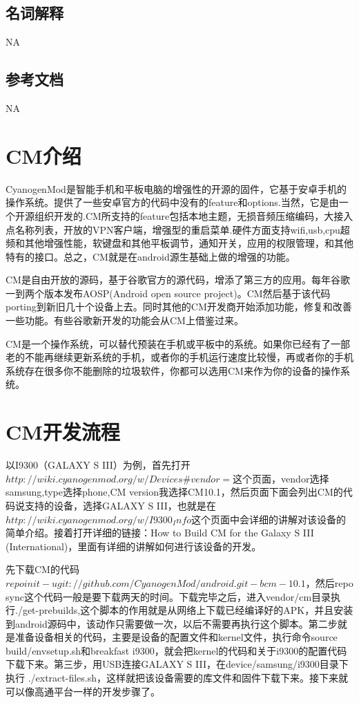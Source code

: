 \documentclass[12pt,a4paper]{article}
\begin{document}
\subsection{名词解释}
NA
\label{1_4}

\subsection{参考文档}
NA
\label{1_5}
\label{1}



\section{CM介绍}
  CyanogenMod是智能手机和平板电脑的增强性的开源的固件，它基于安卓手机的操作系统。提供了一些安卓官方的代码中没有的feature和options.当然，它是由一个开源组织开发的.CM所支持的feature包括本地主题，无损音频压缩编码，大接入点名称列表，开放的VPN客户端，增强型的重启菜单.硬件方面支持wifi,usb,cpu超频和其他增强性能，软键盘和其他平板调节，通知开关，应用的权限管理，和其他特有的接口。总之，CM就是在android源生基础上做的增强的功能。

  CM是自由开放的源码，基于谷歌官方的源代码，增添了第三方的应用。每年谷歌一到两个版本发布AOSP(Android open source project)。CM然后基于该代码porting到新旧几十个设备上去。同时其他的CM开发商开始添加功能，修复和改善一些功能。有些谷歌新开发的功能会从CM上借鉴过来。

  CM是一个操作系统，可以替代预装在手机或平板中的系统。如果你已经有了一部老的不能再继续更新系统的手机，或者你的手机运行速度比较慢，再或者你的手机系统存在很多你不能删除的垃圾软件，你都可以选用CM来作为你的设备的操作系统。
\label{2}


\section{CM开发流程}
  以I9300（GALAXY S III）为例，首先打开$http://wiki.cyanogenmod.org/w/Devices\#vendor=$这个页面，vendor选择samsung,type选择phone,CM version我选择CM10.1，然后页面下面会列出CM的代码说支持的设备，选择GALAXY S III，也就是在$http://wiki.cyanogenmod.org/w/I9300_Info$这个页面中会详细的讲解对该设备的简单介绍。接着打开详细的链接：How to Build CM for the Galaxy S III (International)，里面有详细的讲解如何进行该设备的开发。

  先下载CM的代码$repo init -u git://github.com/CyanogenMod/android.git -b cm-10.1$，然后repo sync这个代码一般是要下载两天的时间。下载完毕之后，进入vendor/cm目录执行./get-prebuilds,这个脚本的作用就是从网络上下载已经编译好的APK，并且安装到android源码中，该动作只需要做一次，以后不需要再执行这个脚本。第二步就是准备设备相关的代码，主要是设备的配置文件和kernel文件，执行命令source build/envsetup.sh和breakfast i9300，就会把kernel的代码和关于i9300的配置代码下载下来。第三步，用USB连接GALAXY S III，在device/samsung/i9300目录下执行 ./extract-files.sh，这样就把该设备需要的库文件和固件下载下来。接下来就可以像高通平台一样的开发步骤了。
\label{3}
\end{document}
